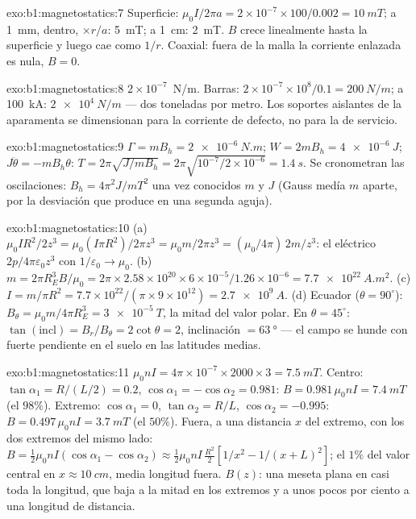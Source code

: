 \begin{solution}{exo:b1:magnetostatics:7}
Superficie: $\mu_0I/2\pi a = 2 \times 10^{-7} \times 100/0.002 = \qty{10}{mT}$; a
\qty{1}{mm}, dentro, $\times r/a$: \qty{5}{mT}; a \qty{1}{cm}: \qty{2}{mT}. $B$ crece
linealmente hasta la superficie y luego cae como $1/r$. Coaxial: fuera de la malla
la corriente enlazada es nula, $B = 0$.
\end{solution}

\begin{solution}{exo:b1:magnetostatics:8}
$2 \times 10^{-7}$~N/m. Barras: $2 \times 10^{-7} \times 10^8/0.1 = \qty{200}{N/m}$;
a \qty{100}{kA}: $\qty{2e4}{N/m}$ --- dos toneladas por metro. Los soportes
aislantes de la aparamenta se dimensionan para la corriente de defecto, no
para la de servicio.
\end{solution}

\begin{solution}{exo:b1:magnetostatics:9}
$\Gamma = mB_h = \qty{2e-6}{N.m}$; $W = 2mB_h = \qty{4e-6}{J}$; $J\ddot\theta =
-mB_h\theta$: $T = 2\pi\sqrt{J/mB_h} = 2\pi\sqrt{10^{-7}/2 \times 10^{-6}} =
\qty{1.4}{s}$. Se cronometran las oscilaciones: $B_h = 4\pi^2J/mT^2$ una vez
conocidos $m$ y $J$ (Gauss medía $m$ aparte, por la desviación que produce
en una segunda aguja).
\end{solution}

\begin{solution}{exo:b1:magnetostatics:10}
(a) $\mu_0IR^2/2z^3 = \mu_0(I\pi R^2)/2\pi z^3 = \mu_0m/2\pi z^3 = (\mu_0/4\pi)\,2m/z^3$:
el eléctrico $2p/4\pi\varepsilon_0z^3$ con $1/\varepsilon_0 \to \mu_0$. (b) $m = 2\pi R_E^3B/
\mu_0 = 2\pi \times 2.58 \times 10^{20} \times 6 \times 10^{-5}/1.26 \times 10^{-6} = \qty{7.7e22}{A.m^2}$.
(c) $I = m/\pi R^2 = 7.7 \times 10^{22}/(\pi \times 9 \times 10^{12}) = \qty{2.7e9}{A}$. (d)
Ecuador ($\theta = 90^\circ$): $B_\theta = \mu_0m/4\pi R_E^3 = \qty{3e-5}{T}$, la mitad del
valor polar. En $\theta = 45^\circ$: $\tan(\text{incl}) = B_r/B_\theta = 2\cot\theta = 2$,
inclinación $= \qty{63}{\degree}$ --- el campo se hunde con fuerte pendiente en el
suelo en las latitudes medias.
\end{solution}

\begin{solution}{exo:b1:magnetostatics:11}
$\mu_0nI = 4\pi \times 10^{-7} \times 2000 \times 3 = \qty{7.5}{mT}$. Centro: $\tan\alpha_1 =
R/(L/2) = 0.2$, $\cos\alpha_1 = -\cos\alpha_2 = 0.981$: $B = 0.981\,\mu_0nI =
\qty{7.4}{mT}$ (el $98\%$). Extremo: $\cos\alpha_1 = 0$, $\tan\alpha_2 = R/L$, $\cos\alpha_2 =
-0.995$: $B = 0.497\,\mu_0nI = \qty{3.7}{mT}$ (el $50\%$). Fuera, a una distancia $x$ del
extremo, con los dos extremos del mismo lado: $B = \tfrac12\mu_0nI(\cos\alpha_1 - \cos\alpha_2)
\approx \tfrac12\mu_0nI\,\tfrac{R^2}{2}[1/x^2 - 1/(x + L)^2]$; el $1\%$ del valor
central en $x \approx \qty{10}{cm}$, media longitud fuera. $B(z)$: una meseta plana en
casi toda la longitud, que baja a la mitad en los extremos y a unos pocos
por ciento a una longitud de distancia.
\end{solution}

